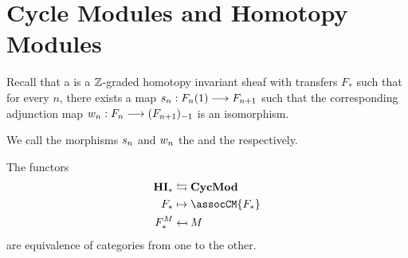 \newpage
\section{Cycle Modules and Homotopy Modules}\label{sect_cycmod_and_hm}

\begin{defn}\label{def_hm}
Recall that a  is a $\mathbb{Z}$-graded homotopy 
invariant sheaf with transfers $F_*$ such that for every $n$, 
there exists a map $s_n: F_n(1) \longrightarrow F_{n+1}$ such that the 
corresponding adjunction map $w_n: F_n \longrightarrow (F_{n+1})_{-1}$
is an isomorphism.

We call the morphisms $s_n$ and $w_n$ the  and the  respectively.
\end{defn}

\begin{thm}\label{thm_corresp_cyc_mod_hom_mod}
The functors
\begin{align*}
\HI_* &\leftrightarrows \CycMod \\
  F_* & \mapsto \assocCM{F_*}   \\
F^M_* & \mapsfrom M
\end{align*}
are equivalence of categories from one to the other.
\end{thm}
